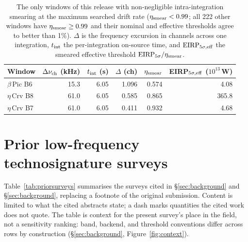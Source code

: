 \documentclass{openjournal}
\begin{document}
\begin{table}
\centering
\caption{The only windows of this release with non-negligible
intra-integration smearing at the maximum searched drift rate
($\eta_{\rm smear}<0.99$; all 222 other windows have
$\eta_{\rm smear}\ge0.99$ and their nominal and effective thresholds
agree to better than 1\%). $\Delta$ is the frequency excursion in
channels across one integration, $t_{\rm int}$ the per-integration
on-source time, and $\mathrm{EIRP}_{5\sigma,\rm eff}$ the smeared
effective threshold $\mathrm{EIRP}_{5\sigma}/\eta_{\rm smear}$.}
\label{tab:smear}
\begin{tabular}{lrrrrr}
\toprule
Window & $\Delta\nu_{\rm ch}$ (kHz) & $t_{\rm int}$ (s) & $\Delta$ (ch) &
$\eta_{\rm smear}$ & EIRP$_{5\sigma,\rm eff}$ ($10^{13}$\,W) \\
\midrule
$\beta$\,Pic B6 & 15.3 & 6.05 & 1.096 & 0.574 & 4.08 \\
$\eta$\,Crv B8 & 61.0 & 6.05 & 0.585 & 0.865 & 365.8 \\
$\eta$\,Crv B7 & 61.0 & 6.05 & 0.411 & 0.932 & 4.68 \\
\bottomrule
\end{tabular}
\end{table}

\section{Prior low-frequency technosignature surveys}
\label{app:priorsurveys}

Table~\ref{tab:priorsurveys} summarises the surveys cited in
\S\ref{sec:background} and \S\ref{sec:background}, replacing a footnote of the
original submission. Content is limited to what the cited abstracts
state; a dash marks quantities the cited work does not quote. The
table is context for the present survey's place in the field, not a
sensitivity ranking: band, backend, and threshold conventions differ
across rows by construction (\S\ref{sec:background},
Figure~\ref{fig:context}).
\end{document}
